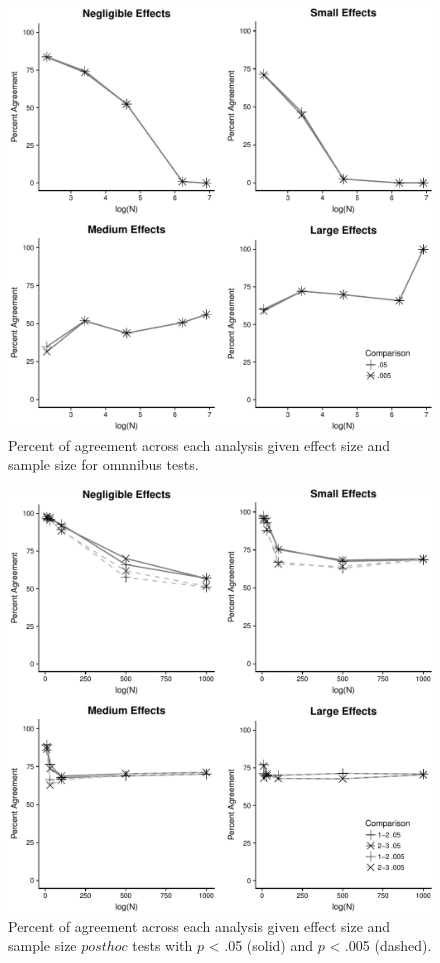 \documentclass[english,man]{apa6}
\theoremstyle{definition}
\theoremstyle{definition}
\theoremstyle{definition}
\theoremstyle{remark}
\begin{document}
\begin{figure}
\centering
\includegraphics{alt_nhst_V2.kv.1.10_files/figure-latex/agree-graph-omnibus-1.pdf}
\caption{\label{fig:agree-graph-omnibus}Percent of agreement across each
analysis given effect size and sample size for omnnibus tests.}
\end{figure}

\begin{figure}
\centering
\includegraphics{alt_nhst_V2.kv.1.10_files/figure-latex/agree-graph-post-1.pdf}
\caption{\label{fig:agree-graph-post}Percent of agreement across each
analysis given effect size and sample size \(post hoc\) tests with \(p\)
\textless{} .05 (solid) and \(p\) \textless{} .005 (dashed).}
\end{figure}
\end{document}
